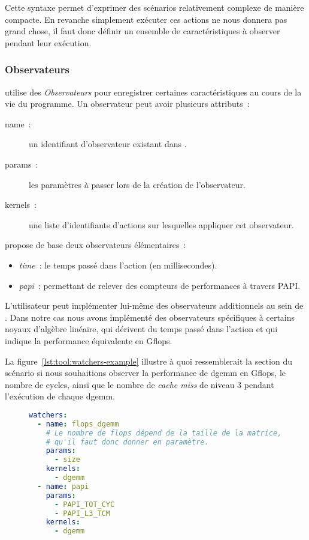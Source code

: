 Cette syntaxe permet d'exprimer des scénarios relativement complexe de manière compacte.
En revanche simplement exécuter ces actions ne nous donnera pas grand chose, il faut donc définir un ensemble de caractéristiques à observer pendant leur exécution.

\subsubsection{Observateurs}

\outil utilise des \emph{Observateurs} pour enregistrer certaines caractéristiques au cours de la vie du programme.
Un observateur peut avoir plusieurs attributs~:
\begin{description}
  \item [name~:] un identifiant d'observateur existant dans \outil.
  \item [params~:] les paramètres à passer lors de la création de l'observateur.
  \item [kernels~:] une liste d'identifiants d'actions sur lesquelles appliquer cet observateur.
\end{description}

\outil propose de base deux observateurs élémentaires~:

\begin{itemize}
  \item \emph{time}~: le temps passé dans l'action (en millisecondes).
  \item \emph{papi}~: permettant de relever des compteurs de performances à travers PAPI.
\end{itemize}

L'utilisateur peut implémenter lui-même des observateurs additionnels au sein de \outil.
Dans notre cas nous avons implémenté des observateurs spécifiques à certains noyaux d'algèbre linéaire, qui dérivent du temps passé dans l'action et qui indique la performance équivalente en Gflops.

La figure~\ref{lst:tool:watchers-example} illustre à quoi ressemblerait la section du scénario si nous souhaitions observer la performance de dgemm en Gflops, le nombre de cycles, ainsi que le nombre de \emph{cache miss} de niveau 3 pendant l'exécution de chaque dgemm.

\begin{figure}[h!]
\begin{lstlisting}[language=yaml,caption=Exemple de déclaration d'observateurs,label=lst:tool:watchers-example]
watchers:
  - name: flops_dgemm
    # Le nombre de flops dépend de la taille de la matrice,
    # qu'il faut donc donner en paramètre.
    params:
      - size
    kernels:
      - dgemm
  - name: papi
    params:
      - PAPI_TOT_CYC
      - PAPI_L3_TCM
    kernels:
      - dgemm
\end{lstlisting}
\end{figure}

